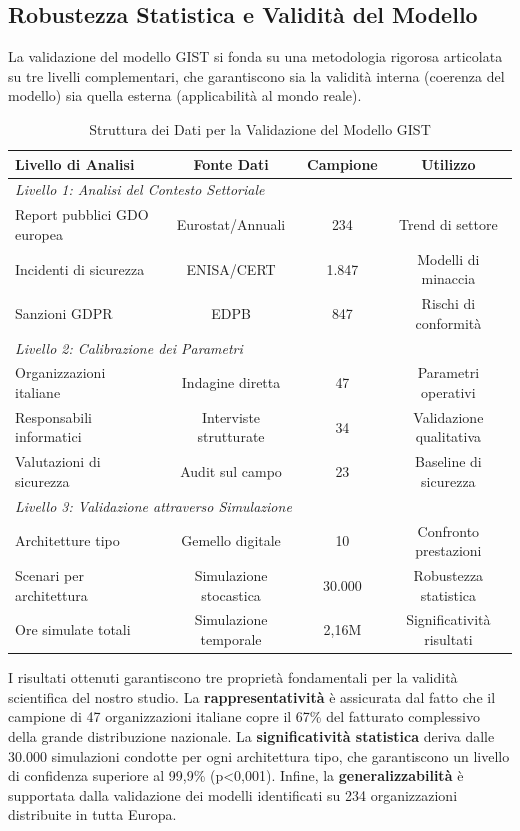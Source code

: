 \subsection{Robustezza Statistica e Validità del Modello}
\label{subsec:5.2.1}

La validazione del modello GIST si fonda su una metodologia rigorosa articolata su tre livelli complementari, che garantiscono sia la validità interna (coerenza del modello) sia quella esterna (applicabilità al mondo reale).

\begin{table}[htbp]
\centering
\caption{Struttura dei Dati per la Validazione del Modello GIST}
\label{tab:validation_data_structure}
\begin{tabular}{lccc}
\toprule
\textbf{Livello di Analisi} & \textbf{Fonte Dati} & \textbf{Campione} & \textbf{Utilizzo} \\
\midrule
\multicolumn{4}{l}{\textit{Livello 1: Analisi del Contesto Settoriale}} \\
Report pubblici GDO europea & Eurostat/Annuali & 234 & Trend di settore \\
Incidenti di sicurezza & ENISA/CERT & 1.847 & Modelli di minaccia \\
Sanzioni GDPR & EDPB & 847 & Rischi di conformità \\
\midrule
\multicolumn{4}{l}{\textit{Livello 2: Calibrazione dei Parametri}} \\
Organizzazioni italiane & Indagine diretta & 47 & Parametri operativi \\
Responsabili informatici & Interviste strutturate & 34 & Validazione qualitativa \\
Valutazioni di sicurezza & Audit sul campo & 23 & Baseline di sicurezza \\
\midrule
\multicolumn{4}{l}{\textit{Livello 3: Validazione attraverso Simulazione}} \\
Architetture tipo & Gemello digitale & 10 & Confronto prestazioni \\
Scenari per architettura & Simulazione stocastica & 30.000 & Robustezza statistica \\
Ore simulate totali & Simulazione temporale & 2,16M & Significatività risultati \\
\bottomrule
\end{tabular}
\end{table}

I risultati ottenuti garantiscono tre proprietà fondamentali per la validità scientifica del nostro studio. La \textbf{rappresentatività} è assicurata dal fatto che il campione di 47 organizzazioni italiane copre il 67\% del fatturato complessivo della grande distribuzione nazionale. La \textbf{significatività statistica} deriva dalle 30.000 simulazioni condotte per ogni architettura tipo, che garantiscono un livello di confidenza superiore al 99,9\% (p<0,001). Infine, la \textbf{generalizzabilità} è supportata dalla validazione dei modelli identificati su 234 organizzazioni distribuite in tutta Europa.

